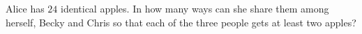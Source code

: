 Alice has \(24\) identical apples. In how many ways can she share them among herself, Becky and Chris so that each of the three people gets at least two apples?
